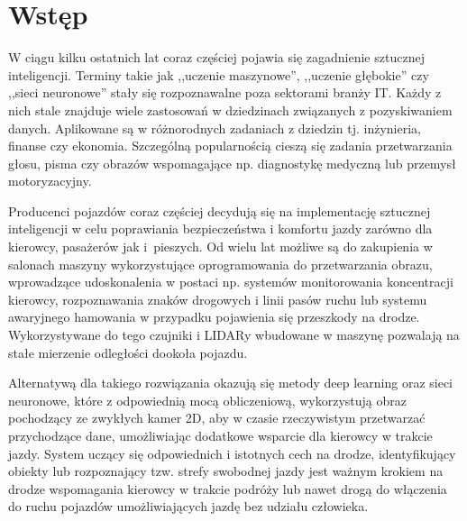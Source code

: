 \chapter{Wstęp}



\hspace{0.5cm}
W ciągu kilku ostatnich lat coraz częściej pojawia się zagadnienie sztucznej inteligencji. Terminy takie jak ,,uczenie maszynowe'', ,,uczenie głębokie'' czy ,,sieci neuronowe'' stały się rozpoznawalne poza sektorami branży IT. Każdy z nich stale znajduje wiele zastosowań w dziedzinach związanych z pozyskiwaniem danych. Aplikowane są w różnorodnych zadaniach z dziedzin tj. inżynieria, finanse czy ekonomia. Szczególną popularnością cieszą się zadania przetwarzania głosu, pisma czy obrazów \cite{OsowskiSieci} wspomagające np. diagnostykę medyczną lub przemysł motoryzacyjny. 

\hspace{0.5cm}
Producenci pojazdów coraz częściej decydują się na implementację sztucznej inteligencji w celu poprawiania bezpieczeństwa i komfortu jazdy zarówno dla kierowcy, pasażerów jak i~pieszych. Od wielu lat możliwe są do zakupienia w salonach maszyny wykorzystujące oprogramowania do przetwarzania obrazu, wprowadzące udoskonalenia w postaci np. systemów monitorowania koncentracji kierowcy, rozpoznawania znaków drogowych i linii pasów ruchu lub systemu awaryjnego hamowania w przypadku pojawienia się przeszkody na drodze. Wykorzystywane do tego czujniki i LIDARy wbudowane w maszynę pozwalają na stałe mierzenie odległości dookoła pojazdu. 

\hspace{0.5cm}
Alternatywą dla  takiego rozwiązania okazują się metody deep learning oraz  sieci neuronowe, które z odpowiednią mocą obliczeniową, wykorzystują obraz pochodzący ze zwykłych kamer 2D, aby w czasie rzeczywistym przetwarzać przychodzące dane, umożliwiając dodatkowe wsparcie dla kierowcy w trakcie jazdy. System uczący się odpowiednich i istotnych cech na drodze, identyfikujący obiekty lub rozpoznający tzw. strefy swobodnej jazdy jest ważnym krokiem na drodze wspomagania kierowcy w trakcie podróży lub nawet drogą do włączenia do ruchu pojazdów umożliwiających jazdę bez udziału człowieka. 

